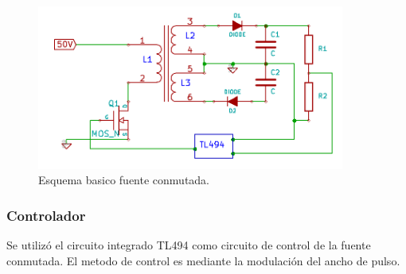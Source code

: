 \begin{figure}[H]
\centering
\includegraphics[width=0.90\textwidth]{img/conmutada_basica.png}
\caption{Esquema  basico fuente conmutada.}
\label{conmutada_basica}
\end{figure}

\subsubsection{Controlador}

Se utilizó el circuito integrado TL494 como circuito de control de la fuente conmutada. El metodo de control es mediante la modulación del ancho de pulso. 

